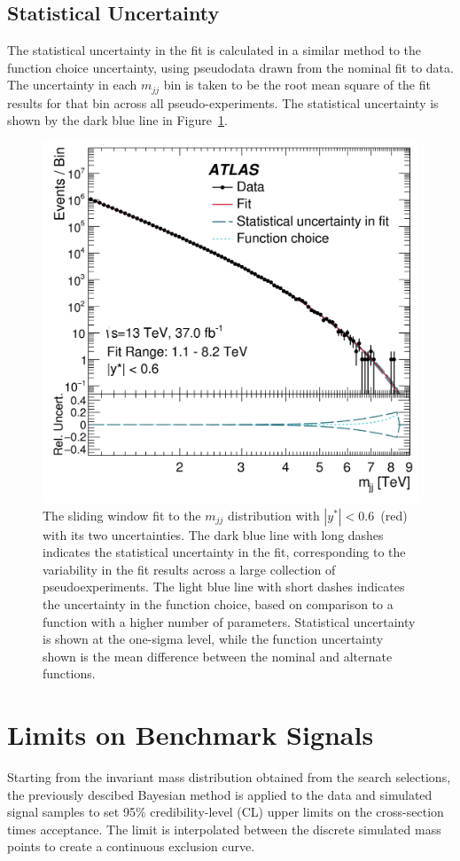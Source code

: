 \subsection{Statistical Uncertainty}

The statistical uncertainty in the fit is calculated in a similar method to the function choice uncertainty, using pseudodata drawn from the nominal fit to data.  The uncertainty in each $m_{jj}$ bin is taken to be the root mean square of the fit results for that bin across all pseudo-experiments.  The statistical uncertainty is shown by the dark blue line in Figure~\ref{fig:FitUncertainty}.

\begin{figure}[ht!]
	\centering
	\includegraphics[width=0.5\columnwidth]{figures/Results/FitUncertainty.png}
	\caption{The sliding window fit to the $m_{jj}$ distribution with $|y^*|<0.6$~(red) with its two uncertainties. The dark blue line with long dashes indicates the statistical uncertainty in the fit, corresponding to the variability in the fit results across a large collection of pseudoexperiments. The light blue line with short dashes indicates the uncertainty in the function choice, based on comparison to a function with a higher number of parameters. Statistical uncertainty is shown at the one-sigma level, while the function uncertainty shown is the mean difference between the nominal and alternate functions.}
	\label{fig:FitUncertainty}
\end{figure}

\section{Limits on Benchmark Signals}

Starting from the invariant mass distribution obtained from the search selections, the previously descibed Bayesian method is applied to the data and simulated signal samples to set 95\% credibility-level (CL) upper limits on the cross-section times acceptance.  The limit is interpolated between the discrete simulated mass points to create a continuous exclusion curve.

